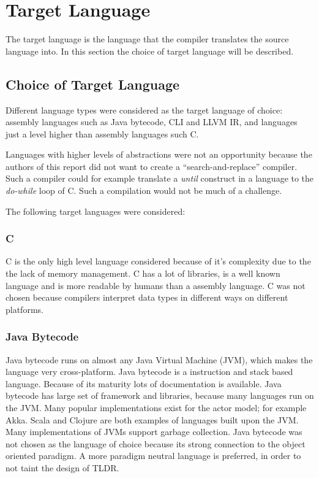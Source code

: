 \section{Target Language}
\label{sec:targetLanguage}

The target language is the language that the compiler translates the source language into. In this section the choice of target language will be described.

\subsection{Choice of Target Language}

Different language types were considered as the target language of choice: assembly languages such as Java bytecode, CLI and LLVM IR, and languages just a level higher than assembly languages such C.

Languages with higher levels of abstractions were not an opportunity because the authors of this report did not want to create a \enquote{search-and-replace} compiler. Such a compiler could for example translate a \emph{until} construct in a language to the \emph{do-while} loop of C. Such a compilation would not be much of a challenge. 

The following target languages were considered:

\subsubsection{C}
C is the only high level language considered because of it's complexity due to the the lack of memory management. C has a lot of libraries, is a well known language and is more readable by humans than a assembly language. C was not chosen because compilers interpret data types in different ways on different platforms. 

\subsubsection{Java Bytecode}
Java bytecode runs on almost any Java Virtual Machine (JVM), which makes the language very cross-platform. Java bytecode is a instruction and stack based language. Because of its maturity lots of documentation is available. Java bytecode has large set of framework and libraries, because many languages run on the JVM. Many popular implementations exist for the actor model; for example Akka. Scala and Clojure are both examples of languages built upon the JVM. Many implementations of JVMs support garbage collection. Java bytecode was not chosen as the language of choice because its strong connection to the object oriented paradigm. A more paradigm neutral language is preferred, in order to not taint the design of TLDR.

